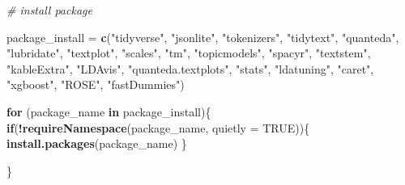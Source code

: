 \documentclass[11pt,]{article}
\newenvironment{Shaded}{\begin{snugshade}}{\end{snugshade}}
\newcommand{\AttributeTok}[1]{\textcolor[rgb]{0.13,0.29,0.53}{#1}}
\newcommand{\CommentTok}[1]{\textcolor[rgb]{0.56,0.35,0.01}{\textit{#1}}}
\newcommand{\ConstantTok}[1]{\textcolor[rgb]{0.56,0.35,0.01}{#1}}
\newcommand{\ControlFlowTok}[1]{\textcolor[rgb]{0.13,0.29,0.53}{\textbf{#1}}}
\newcommand{\FunctionTok}[1]{\textcolor[rgb]{0.13,0.29,0.53}{\textbf{#1}}}
\newcommand{\NormalTok}[1]{#1}
\newcommand{\OtherTok}[1]{\textcolor[rgb]{0.56,0.35,0.01}{#1}}
\newcommand{\SpecialCharTok}[1]{\textcolor[rgb]{0.81,0.36,0.00}{\textbf{#1}}}
\newcommand{\StringTok}[1]{\textcolor[rgb]{0.31,0.60,0.02}{#1}}
\begin{document}
\begin{Shaded}
\begin{Highlighting}[]
\CommentTok{\# install package}

\NormalTok{package\_install }\OtherTok{=} \FunctionTok{c}\NormalTok{(}\StringTok{"tidyverse"}\NormalTok{,}
                    \StringTok{"jsonlite"}\NormalTok{,}
                    \StringTok{"tokenizers"}\NormalTok{,}
                    \StringTok{"tidytext"}\NormalTok{,}
                    \StringTok{"quanteda"}\NormalTok{, }
                    \StringTok{"lubridate"}\NormalTok{,}
                    \StringTok{"textplot"}\NormalTok{,}
                    \StringTok{"scales"}\NormalTok{,}
                    \StringTok{"tm"}\NormalTok{,}
                    \StringTok{"topicmodels"}\NormalTok{,}
                    \StringTok{"spacyr"}\NormalTok{,}
                    \StringTok{"textstem"}\NormalTok{,}
                    \StringTok{"kableExtra"}\NormalTok{,}
                    \StringTok{"LDAvis"}\NormalTok{,}
                    \StringTok{"quanteda.textplots"}\NormalTok{,}
                    \StringTok{"stats"}\NormalTok{,}
                    \StringTok{"ldatuning"}\NormalTok{,}
                    \StringTok{"caret"}\NormalTok{,}
                    \StringTok{"xgboost"}\NormalTok{,}
                    \StringTok{"ROSE"}\NormalTok{,}
                    \StringTok{"fastDummies"}\NormalTok{)}

\ControlFlowTok{for}\NormalTok{ (package\_name }\ControlFlowTok{in}\NormalTok{ package\_install)\{}
\ControlFlowTok{if}\NormalTok{(}\SpecialCharTok{!}\FunctionTok{requireNamespace}\NormalTok{(package\_name, }\AttributeTok{quietly =} \ConstantTok{TRUE}\NormalTok{))\{}
  \FunctionTok{install.packages}\NormalTok{(package\_name)}
\NormalTok{\}}

\NormalTok{\}}
\end{Highlighting}
\end{Shaded}
\end{document}
